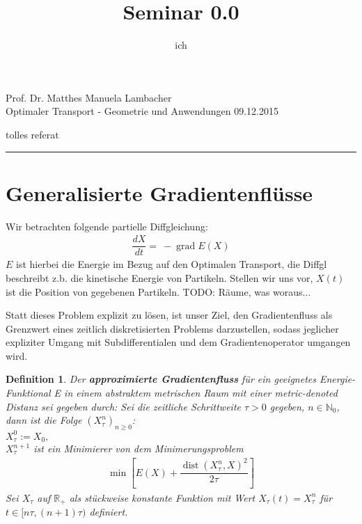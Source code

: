 \documentclass[11pt,a4paper,notitlepage]{scrreprt}
\author{ich}
\title{Seminar 0.0}
\newcommand{\RR}{\mathbb{R}}
\newcommand{\NN}{\mathbb{N}}
\newcommand{\dist}{\operatorname{dist}}
\newcommand{\grad}{\operatorname{grad}}
\newtheorem{defi}{Definition}[section]
\begin{document}
\parindent 0pt



\pagestyle{plain}



 Prof. Dr. Matthes \hfill Manuela Lambacher\\
 Optimaler Transport - Geometrie und Anwendungen \hfill 09.12.2015
 \begin{center}
  {\huge{tolles referat}} 
 \end{center}
 
 \hrule
 
\renewcommand{\thechapter}{\arabic{section}}
\renewcommand{\thesection}{\arabic{section}}
\section{Generalisierte Gradientenflüsse}

Wir betrachten folgende partielle Diffgleichung: 
\begin{eqnarray}
\dfrac{dX}{dt}=~-\grad E(X) \label{eq1}
\end{eqnarray}
$E$ ist hierbei die Energie im Bezug auf den Optimalen Transport, die Diffgl beschreibt z.b. die kinetische Energie von Partikeln. 
Stellen wir uns vor, $X(t)$ ist die Position von gegebenen Partikeln.
TODO: Räume, was woraus... 
\newline

Statt dieses Problem explizit zu lösen, ist unser Ziel, den Gradientenfluss als Grenzwert eines zeitlich diskretisierten Problems darzustellen, sodass jeglicher expliziter Umgang mit Subdifferentialen und dem Gradientenoperator umgangen wird.

\begin{defi}\label{approx}
Der \textbf{approximierte Gradientenfluss} für ein geeignetes Energie-Funktional E in einem abstraktem metrischen Raum mit einer metric-denoted Distanz sei gegeben durch:
\newline
Sei die zeitliche Schrittweite $\tau > 0$ gegeben, $n\in\NN_0$, dann ist die Folge $\left( X^n_\tau \right)_{n\geq 0}$:
\\
$X_\tau^0:=X_0,$
\\
$X_\tau^{n+1}$ ist ein Minimierer von dem Minimerungsproblem
\begin{eqnarray}
\min\left[E(X)+\dfrac{\dist(X_\tau^n,X)^2}{2\tau}\right] \label{Min}
\end{eqnarray}
Sei $X_\tau$ auf $\RR_+$ als stückweise konstante Funktion mit Wert $X_\tau(t)=X^n_\tau$ für $t\in [n\tau,(n+1)\tau)$ definiert.
\end{defi}
\end{document}

